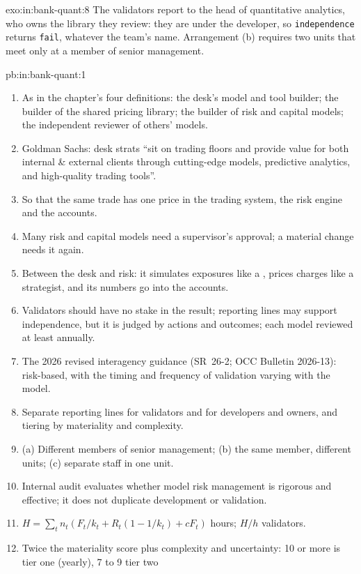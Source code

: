 \begin{solution}{exo:in:bank-quant:8}
The validators report to the head of quantitative analytics, who owns the library they review: they are under the
developer, so \texttt{independence} returns \texttt{fail}, whatever the team's name. Arrangement (b) requires two units
that meet only at a member of senior management.
\end{solution}

\begin{solution}{pb:in:bank-quant:1}
\begin{enumerate}
\item As in the chapter's four definitions: the desk's model and tool builder; the builder of the shared pricing library;
the builder of risk and capital models; the independent reviewer of others' models.
\item Goldman Sachs: desk strats ``sit on trading floors and provide value for both internal \& external clients through
cutting-edge models, predictive analytics, and high-quality trading tools''.
\item So that the same trade has one price in the trading system, the risk engine and the accounts.
\item Many risk and capital models need a supervisor's approval; a material change needs it again.
\item Between the desk and risk: it simulates exposures like a , prices charges like a strategist, and its
numbers go into the accounts.
\item Validators should have no stake in the result; reporting lines may support independence, but it is judged by
actions and outcomes; each model reviewed at least annually.
\item The 2026 revised interagency guidance (SR~26-2; OCC Bulletin 2026-13): risk-based, with the timing and frequency of
validation varying with the model.
\item Separate reporting lines for validators and for developers and owners, and tiering by materiality and complexity.
\item (a) Different members of senior management; (b) the same member, different units; (c) separate staff in one unit.
\item Internal audit evaluates whether model risk management is rigorous and effective; it does not duplicate development
or validation.
\item $H=\sum_t n_t(F_t/k_t+R_t(1-1/k_t)+cF_t)$ hours; $H/h$ validators.
\item Twice the materiality score plus complexity and uncertainty: 10 or more is tier one (yearly), 7 to 9 tier two

\end{enumerate}
\end{solution}
